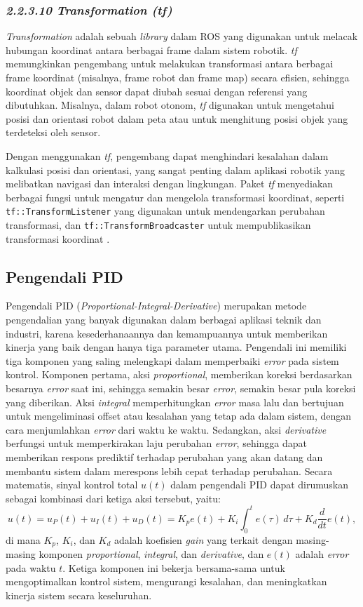 \subsubsection{\emph{2.2.3.10 Transformation (tf)}}
\emph{Transformation} adalah sebuah \emph{library} dalam ROS yang digunakan untuk melacak hubungan koordinat antara berbagai frame dalam sistem robotik. \emph{tf} memungkinkan pengembang untuk melakukan transformasi antara berbagai frame koordinat (misalnya, frame robot dan frame map) secara efisien, sehingga koordinat objek dan sensor dapat diubah sesuai dengan referensi yang dibutuhkan. Misalnya, dalam robot otonom, \emph{tf} digunakan untuk mengetahui posisi dan orientasi robot dalam peta atau untuk menghitung posisi objek yang terdeteksi oleh sensor.

Dengan menggunakan \emph{tf}, pengembang dapat menghindari kesalahan dalam kalkulasi posisi dan orientasi, yang sangat penting dalam aplikasi robotik yang melibatkan navigasi dan interaksi dengan lingkungan. Paket \emph{tf} menyediakan berbagai fungsi untuk mengatur dan mengelola transformasi koordinat, seperti \texttt{tf::TransformListener} yang digunakan untuk mendengarkan perubahan transformasi, dan \texttt{tf::TransformBroadcaster} untuk mempublikasikan transformasi koordinat \cite{ros_noetic}.


\subsection{Pengendali PID}
Pengendali PID (\emph{Proportional-Integral-Derivative}) merupakan metode pengendalian yang banyak digunakan dalam berbagai aplikasi teknik dan industri, karena kesederhanaannya dan kemampuannya untuk memberikan kinerja yang baik dengan hanya tiga parameter utama. Pengendali ini memiliki tiga komponen yang saling melengkapi dalam memperbaiki \emph{error} pada sistem kontrol. Komponen pertama, aksi \emph{proportional}, memberikan koreksi berdasarkan besarnya \emph{error} saat ini, sehingga semakin besar \emph{error}, semakin besar pula koreksi yang diberikan. Aksi \emph{integral} memperhitungkan \emph{error} masa lalu dan bertujuan untuk mengeliminasi offset atau kesalahan yang tetap ada dalam sistem, dengan cara menjumlahkan \emph{error} dari waktu ke waktu. Sedangkan, aksi \emph{derivative} berfungsi untuk memperkirakan laju perubahan \emph{error}, sehingga dapat memberikan respons prediktif terhadap perubahan yang akan datang dan membantu sistem dalam merespons lebih cepat terhadap perubahan. Secara matematis, sinyal kontrol total \( u(t) \) dalam pengendali PID dapat dirumuskan sebagai kombinasi dari ketiga aksi tersebut, yaitu: 
\begin{equation}
    u(t) = u_P(t) + u_I(t) + u_D(t) = K_p e(t) + K_i \int_{0}^{t} e(\tau) \, d\tau + K_d \frac{d}{dt}e(t),
\end{equation}
di mana \( K_p \), \( K_i \), dan \( K_d \) adalah koefisien \emph{gain} yang terkait dengan masing-masing komponen \emph{proportional}, \emph{integral}, dan \emph{derivative}, dan \( e(t) \) adalah \emph{error} pada waktu \( t \). Ketiga komponen ini bekerja bersama-sama untuk mengoptimalkan kontrol sistem, mengurangi kesalahan, dan meningkatkan kinerja sistem secara keseluruhan.





